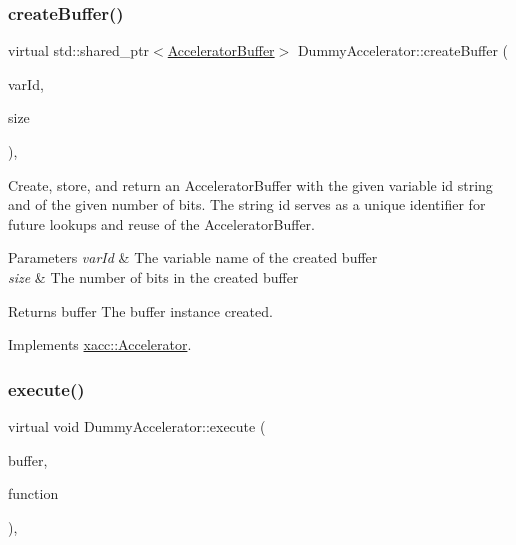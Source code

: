 \subsubsection{\texorpdfstring{create\+Buffer()}{createBuffer()}}
{\footnotesize\ttfamily virtual std\+::shared\+\_\+ptr$<$\hyperlink{a01096}{Accelerator\+Buffer}$>$ Dummy\+Accelerator\+::create\+Buffer (\begin{DoxyParamCaption}\item[{const std\+::string \&}]{var\+Id,  }\item[{const int}]{size }\end{DoxyParamCaption})\hspace{0.3cm}{\ttfamily [inline]}, {\ttfamily [virtual]}}

Create, store, and return an Accelerator\+Buffer with the given variable id string and of the given number of bits. The string id serves as a unique identifier for future lookups and reuse of the Accelerator\+Buffer.


\begin{DoxyParams}{Parameters}
{\em var\+Id} & The variable name of the created buffer \\
\hline
{\em size} & The number of bits in the created buffer \\
\hline
\end{DoxyParams}
\begin{DoxyReturn}{Returns}
buffer The buffer instance created. 
\end{DoxyReturn}


Implements \hyperlink{a01084_a064a2dbd58338364115c260267806945}{xacc\+::\+Accelerator}.

\mbox{\label{a00976_a389ba22af5d0d964f5d5367f01712b3c}} 
\subsubsection{\texorpdfstring{execute()}{execute()}}
{\footnotesize\ttfamily virtual void Dummy\+Accelerator\+::execute (\begin{DoxyParamCaption}\item[{std\+::shared\+\_\+ptr$<$ \hyperlink{a01096}{Accelerator\+Buffer} $>$}]{buffer,  }\item[{const std\+::shared\+\_\+ptr$<$ \hyperlink{a01124}{Function} $>$}]{function }\end{DoxyParamCaption})\hspace{0.3cm}{\ttfamily [inline]}, {\ttfamily [virtual]}}

